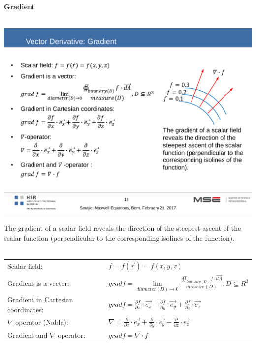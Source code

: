 \textbf{\\ \\ Gradient\\ \\}
\begin{minipage}[lt]{5cm}
	\includegraphics[width=.8\textwidth]{./images/Gradient.pdf}
\end{minipage}
\begin{minipage}[rt]{13cm}
	The gradient of a scalar field reveals the direction of the steepest ascent of the scalar function (perpendicular to the corresponding isolines of the function). \\ \\
	\begin{tabular}{ll}
		Scalar field: & $f = f\left(\vec{r}\right) = f\left(x,y,z\right)$ \\ 
		Gradient is a vector: & $grad f = \lim\limits_{diameter\left(D\right)\rightarrow 0} \frac{\oiint_{boundary\left(D\right)}f \cdot \vec{dA}}{measure\left(D\right)}, D\subseteq R^3 $\\
		Gradient in Cartesian coordinates: & $grad f = \frac{\partial f}{\partial x} \cdot \vec{e_x}+\frac{\partial f}{\partial y} \cdot \vec{e_y}+\frac{\partial f}{\partial z} \cdot \vec{e_z}$\\ 
		$\nabla$-operator (Nabla): & $\nabla = \frac{\partial}{\partial x} \cdot \vec{e_x}+\frac{\partial}{\partial y} \cdot \vec{e_y}+\frac{\partial}{\partial z} \cdot \vec{e_z}$\\
		Gradient and $\nabla$-operator: & $grad f = \nabla \cdot f$\\
	\end{tabular} 
\end{minipage}

